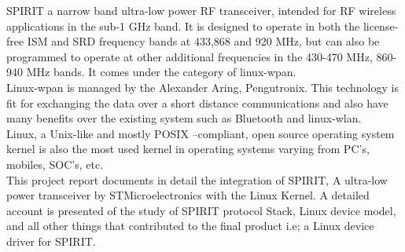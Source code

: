 \begin{Large}
\end{Large}

\vskip 0.1in
\noindent SPIRIT a narrow band ultra-low power RF transceiver, intended for RF wireless applications in the sub-1 GHz band. It is designed to operate in both the license-free ISM and SRD frequency bands at 433,868 and 920 MHz, but can also be programmed to operate at other additional frequencies in the 430-470 MHz, 860-940 MHz bands. It comes under the category of linux-wpan.\\
 Linux-wpan is managed by the Alexander Aring, Pengutronix. This technology is fit for exchanging the data over a short distance communications and also have many benefits over the existing system such as Bluetooth and linux-wlan. \\ 
\noindent Linux, a Unix-like and mostly POSIX –compliant, open source operating system kernel is also the most used kernel in operating systems varying from PC’s, mobiles, SOC’s, etc.\\
\noindent This project report documents in detail the integration of SPIRIT, A ultra-low power transceiver by STMicroelectronics with the Linux Kernel. A detailed account is presented of the study of SPIRIT protocol Stack, Linux device model, and all other things that contributed to the final product i.e; a Linux device driver for SPIRIT.
